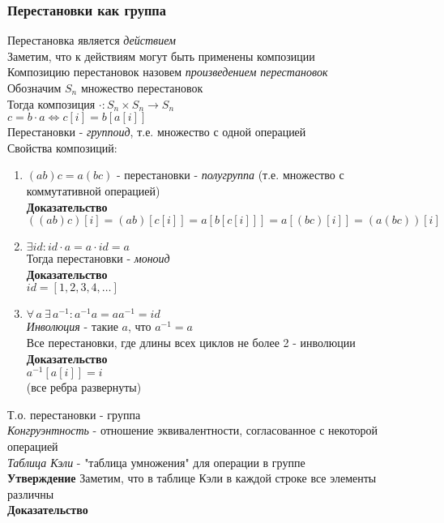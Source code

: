 \documentclass[12pt]{article}
\begin{document}
\subsubsection{Перестановки как группа}
Перестановка является \textit{действием}\\
Заметим, что к действиям могут быть применены композиции\\
Композицию перестановок назовем \textit{произведением перестановок}\\
Обозначим $S_n$ множество перестановок\\
Тогда композиция $\cdot: S_n\times S_n \rightarrow S_n$\\
$c = b\cdot a \Leftrightarrow c[i] = b[a[i]]$\\
Перестановки - \textit{группоид}, т.е. множество с одной операцией\\
Свойства композиций:
\begin{enumerate}
    \item $(ab)c = a(bc)$ - перестановки - \textit{полугруппа} (т.е. множество с коммутативной операцией)\\
    \textbf{Доказательство}\\
    $((ab)c)[i] = (ab)[c[i]] = a[b[c[i]]] = a[(bc)[i]] = (a(bc))[i]$
    \item $\exists id: id\cdot a = a \cdot id = a$\\
    Тогда перестановки - \textit{моноид}\\
    \textbf{Доказательство}\\
    $id = [1, 2, 3, 4, \ldots]$
    \item $\forall\,a\ \exists\,a^{-1}: a^{-1}a=aa^{-1}=id$\\
    \textit{Инволюция} - такие $a$, что $a^{-1} = a$\\
    Все перестановки, где длины всех циклов не более 2 - инволюции\\
    \textbf{Доказательство}\\
    $a^{-1}[a[i]] = i$\\
    (все ребра развернуты)
\end{enumerate}
Т.о. перестановки - группа\\
\textit{Конгруэнтность} - отношение эквивалентности, согласованное с некоторой операцией\\
\textit{Таблица Кэли} - "таблица умножения" для операции в группе\\
\textbf{Утверждение}
Заметим, что в таблице Кэли в каждой строке все элементы различны\\
\textbf{Доказательство}\\
\end{document}
